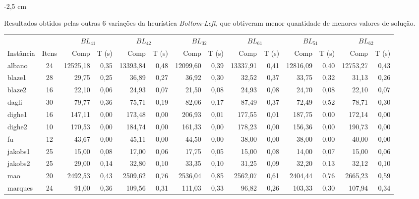\documentclass[12pt, openright, twoside, a4paper, english, brazilian]{USPSC-classe/USPSC}
\newcommand{\lgray}{\cellcolor{lightgray}}
\begin{document}
\begin{adjustwidth}{-2 cm}{-2,5 cm}\centering\begin{threeparttable}[!htb]
\renewcommand{\arraystretch}{1.2}%
    \caption{Resultados obtidos pelas outras 6 variações da heurística {\it Bottom-Left}, que obtiveram menor quantidade de menores valores de solução.}
    \scriptsize{
        \begin{tabular}{|l|c|rr|rr|rr|rr|rr|rr|}\hline
        \multicolumn{1}{|c|}{} & \multicolumn{1}{c|}{} &  \multicolumn{2}{c|}{$BL_{41}$} & \multicolumn{2}{c|}{$BL_{42}$} & \multicolumn{2}{c|}{$BL_{32}$} &
        \multicolumn{2}{c|}{$BL_{61}$} &
        \multicolumn{2}{c|}{$BL_{51}$} &
        \multicolumn{2}{c|}{$BL_{62}$}\\
            Instância &Itens &Comp &T (s) &Comp &T (s) &Comp &T (s) &Comp &T (s) &Comp &T (s) &Comp &T (s) \\\hline
            albano &24  &12525,18 &0,35  &13393,84 &0,48  &12099,60 &0,39  &13337,91 &0,41  &12816,09 &0,40  &12753,27 &0,43 \\
            blaze1 &28  &29,75 &0,25  &36,89 &0,27  &36,92 &0,30  &32,52 &0,37  &33,75 &0,32  &31,13 &0,26 \\
            blaze2 &16  &22,10 &0,06  &24,93 &0,07  &\lgray21,50 &0,08  &24,93 &0,08  &24,70 &0,08  &22,10 &0,07 \\
            dagli &30  &79,77 &0,36  &75,71 &0,19  &82,06 &0,17  &87,49 &0,37  &72,49 &0,52  &78,71 &0,30 \\
            dighe1 &16  &147,11 &0,00  &173,48 &0,00  &206,93 &0,01  &177,55 &0,01  &187,75 &0,00  &172,14 &0,00 \\
            dighe2 &10  &170,53 &0,00  &184,74 &0,00  &161,33 &0,00  &178,23 &0,00  &156,36 &0,00  &190,73 &0,00 \\
            fu &12  &43,67 &0,00  &45,11 &0,00  &44,50 &0,00  &38,00 &0,00  &38,00 &0,00  &40,00 &0,00 \\
            jakobs1 &25  &15,00 &0,08  &17,00 &0,06  &17,75 &0,05  &15,00 &0,08  &14,00 &0,07  &15,00 &0,06 \\
            jakobs2 &25  &\lgray29,00 &0,14  &32,80 &0,10  &33,35 &0,10  &31,25 &0,09  &32,20 &0,13  &32,12 &0,10 \\
            mao &20  &2492,53 &0,43  &2509,62 &0,76  &2536,04 &0,85  &2562,07 &0,61  &2404,44 &0,76  &2665,23 &0,59 \\
            marques &24  &91,00 &0,36  &109,56 &0,31  &111,03 &0,33  &96,82 &0,26  &103,33 &0,30  &107,94 &0,34 \\

\end{tabular}}
\end{threeparttable}
\end{adjustwidth}
\end{document}
